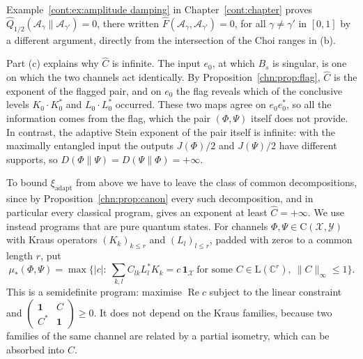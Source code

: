 Example~\ref{cont:ex:amplitude damping} in Chapter~\ref{cont:chapter} proves $\widehat Q_{1/2}(\mathcal A_\gamma\|\mathcal A_{\gamma'})=0$, there written $\widehat F(\mathcal A_\gamma,\mathcal A_{\gamma'})=0$, for all $\gamma\ne\gamma'$ in $[0,1]$ by a different argument, directly from the intersection of the Choi ranges in (b).

Part (c) explains why $\widehat C$ is infinite. The input $e_0$, at which $B_s$ is singular, is one on which the two channels act identically. By Proposition~\ref{chn:prop:flag}, $\widehat C$ is the exponent of the flagged pair, and on $e_0$ the flag reveals which of the conclusive levels $K_0\cdot K_0^*$ and $L_0\cdot L_0^*$ occurred. These two maps agree on $e_0e_0^*$, so all the information comes from the flag, which the pair $(\Phi,\Psi)$ itself does not provide. In contrast, the adaptive Stein exponent of the pair itself is infinite: with the maximally entangled input the outputs $J(\Phi)/2$ and $J(\Psi)/2$ have different supports, so $D(\Phi\|\Psi)=D(\Psi\|\Phi)=+\infty$.

To bound $\xi_{\mathrm{adapt}}$ from above we have to leave the class of common decompositions, since by Proposition~\ref{chn:prop:canon} every such decomposition, and in particular every classical program, gives an exponent at least $\widehat C=+\infty$. We use instead programs that are pure quantum states. For channels $\Phi,\Psi\in\mathrm C(\mathcal X,\mathcal Y)$ with Kraus operators $(K_k)_{k\le r}$ and $(L_l)_{l\le r}$, padded with zeros to a common length $r$, put
\[
\mu_*(\Phi,\Psi)=\max\Big\{|c|:\ \sum_{k,l}C_{lk}L_l^*K_k=c\,\mathbf 1_{\mathcal X}\ \text{for some }C\in\mathrm L(\mathbb C^r),\ \|C\|_\infty\le1\Big\}.
\]
This is a semidefinite program: maximise $\operatorname{Re}c$ subject to the linear constraint and $\begin{pmatrix}\mathbf 1&C\\C^*&\mathbf 1\end{pmatrix}\ge0$. It does not depend on the Kraus families, because two families of the same channel are related by a partial isometry, which can be absorbed into $C$.

